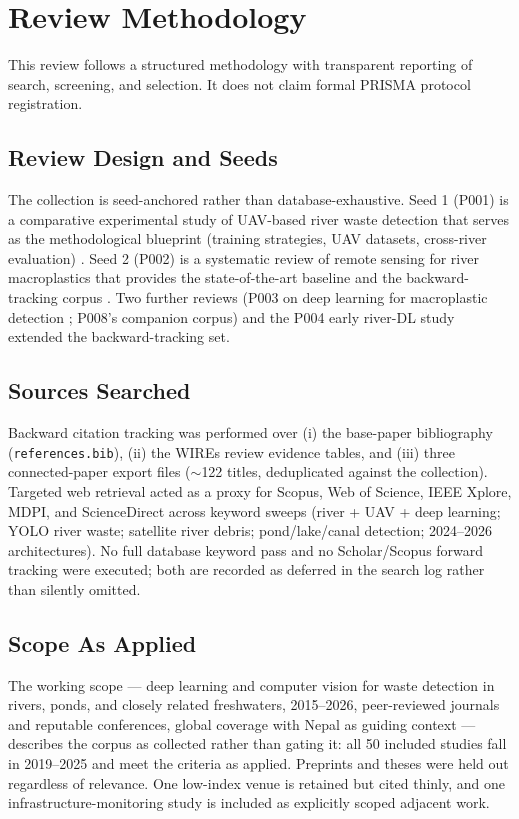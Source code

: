 \section{Review Methodology}
\label{sec:methodology}

This review follows a structured methodology with transparent reporting of search, screening, and selection. It does not claim formal PRISMA protocol registration.

\subsection{Review Design and Seeds}
The collection is seed-anchored rather than database-exhaustive. Seed 1 (P001) is a comparative experimental study of UAV-based river waste detection that serves as the methodological blueprint (training strategies, UAV datasets, cross-river evaluation) \cite{Pati2025}. Seed 2 (P002) is a systematic review of remote sensing for river macroplastics that provides the state-of-the-art baseline and the backward-tracking corpus \cite{Marye2025}. Two further reviews (P003 on deep learning for macroplastic detection \cite{Jia2023}; P008's companion corpus) and the P004 early river-DL study \cite{Jakovljevic2020} extended the backward-tracking set.

\subsection{Sources Searched}
Backward citation tracking was performed over (i) the base-paper bibliography (\texttt{references.bib}), (ii) the WIREs review evidence tables, and (iii) three connected-paper export files ($\sim$122 titles, deduplicated against the collection). Targeted web retrieval acted as a proxy for Scopus, Web of Science, IEEE Xplore, MDPI, and ScienceDirect across keyword sweeps (river + UAV + deep learning; YOLO river waste; satellite river debris; pond/lake/canal detection; 2024--2026 architectures). No full database keyword pass and no Scholar/Scopus forward tracking were executed; both are recorded as deferred in the search log rather than silently omitted.

\subsection{Scope As Applied}
The working scope --- deep learning and computer vision for waste detection in rivers, ponds, and closely related freshwaters, 2015--2026, peer-reviewed journals and reputable conferences, global coverage with Nepal as guiding context --- describes the corpus as collected rather than gating it: all 50 included studies fall in 2019--2025 and meet the criteria as applied. Preprints and theses were held out regardless of relevance. One low-index venue is retained but cited thinly, and one infrastructure-monitoring study is included as explicitly scoped adjacent work.

